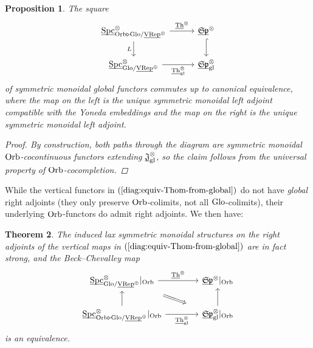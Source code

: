 \documentclass[reqno]{memo-l}
\theoremstyle{mythm}
\newtheorem{thm}{Theorem}[section]
\newtheorem{prop}[thm]{Proposition}
\theoremstyle{definition}
\numberwithin{equation}{section}
\newcommand{\gl}{\textup{gl}}
\DeclareMathOperator{\Spc}{Spc}
\newcommand{\Orb}{{\vphantom{\textup{t}}\smash{\textup{Orb}}}}
\newcommand{\Glo}{\textup{Glo}}
\newcommand{\ulhelper}[2]{\underline{\setbox0=\hbox{$#1#2$}\dp0=0.4pt \box0\relax}}
\newcommand{\ul}[1]{{\mathpalette\ulhelper{#1}}\hbox{\rule[-2pt]{0pt}{0pt}}}
\newcommand{\mySp}{{\mathfrak S\kern-.5pt\mathfrak p}}
\newcommand{\Th}{{\textup{Th}}}
\newcommand{\VRep}{\textup{VRep}}
\begin{document}
\begin{prop}\label{prop:equiv-thom-from-global}
    The square
    \begin{equation}\label{diag:equiv-Thom-from-global}
        \begin{tikzcd}
            \ul\Spc^\otimes_{\Orb\triangleright\Glo/\ul\VRep^{\oplus}}\arrow[d,"L"']\arrow[r,"\ul\Th^\otimes"] &[.5em] \ul\mySp^\otimes\arrow[d,hook]\\
            \ul\Spc_{\Glo/\ul\VRep^{\oplus}}^\otimes\arrow[r,"\ul\Th_\gl^\otimes"'] & \ul\mySp_\gl^\otimes
        \end{tikzcd}
    \end{equation}
    of symmetric monoidal global functors commutes up to canonical equivalence, where the map on the left is the unique symmetric monoidal left adjoint compatible with the Yoneda embeddings and the map on the right is the unique symmetric monoidal left adjoint.
    \begin{proof}
        By construction, both paths through the diagram are symmetric monoidal $\Orb$-cocontinuous functors extending $\ul{\mathfrak J}_\gl^\otimes$, so the claim follows from the universal property of $\Orb$-cocompletion.
    \end{proof}
\end{prop}

While the vertical functors in $(\ref{diag:equiv-Thom-from-global})$ do not have \emph{global} right adjoints (they only preserve $\Orb$-colimits, not all $\Glo$-colimits), their underlying $\Orb$-functors do admit right adjoints. We then have:

\begin{thm}\label{thm:Thom-vs-fgt}
    The induced lax symmetric monoidal structures on the right adjoints of the vertical maps in $(\ref{diag:equiv-Thom-from-global})$ are in fact strong, and the Beck--Chevalley map
    \begin{equation}\label{diag:Thom-fgt-BC}
        \begin{tikzcd}
            \ul\Spc_{\Glo/\ul\VRep^{\oplus}}^\otimes|_{\Orb}\arrow[from=d]\arrow[r,"\ul\Th^\otimes"] \arrow[dr,Rightarrow,shorten=15pt]&[1.5em] \ul\mySp^\otimes|_{\Orb}\arrow[from=d]\\
            \ul\Spc^\otimes_{\Orb\triangleright\Glo/\ul\VRep^{\oplus}}|_{\Orb}\arrow[r,"\ul\Th_\gl^\otimes"'] & \ul\mySp_\gl^\otimes|_{\Orb}
        \end{tikzcd}
    \end{equation}
    is an equivalence.
\end{thm}
\end{document}
